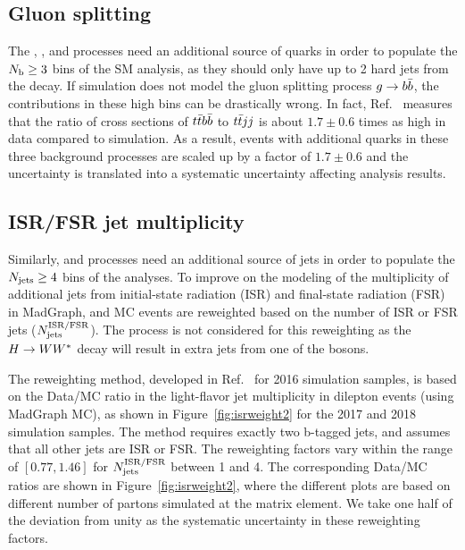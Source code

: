 \subsection{Gluon splitting}

The \ttW, \ttZ, and \ttH processes need an additional source of \cPqb quarks
in order to populate the $N_\mathrm{b}\geq 3$ bins of the SM \tttt analysis, as
they should only have up to 2 hard \cPqb jets from the \ttbar decay.
If simulation does not model the gluon splitting process $g\rightarrow b\bar{b}$,
the contributions in these high \Nbjets bins can be drastically wrong.
In fact, Ref.~\cite{CMS:ttbb} measures that the ratio of cross sections
of $t\bar{t}b\bar{b}$ to $t\bar{t} jj$ is about $1.7\pm0.6$ times as high in data
compared to simulation. As a result, events with additional \cPqb quarks
in these three background processes are scaled up by a factor of 
$1.7\pm0.6$ and the uncertainty is translated into
a systematic uncertainty affecting analysis results. 

\subsection{ISR/FSR jet multiplicity}

Similarly, \ttW and \ttZ processes need an additional source of jets
in order to populate the $N_\text{jets} \geq 4$ bins of the analyses.
To improve on the modeling of the
multiplicity of additional jets from initial-state radiation (ISR) and
final-state radiation (FSR) in MadGraph,
\ttW and \ttZ MC events are reweighted based on the
number of ISR or FSR jets ($N_\text{jets}^{\rm ISR/FSR}$).
The \ttH process is not considered for this reweighting as
the $H\rightarrow WW^*$ decay will result in extra jets from one
of the \PW bosons.

The reweighting method, developed in Ref.~\cite{CMS:isrweight} for 2016
simulation samples, is based on the Data/MC ratio in the light-flavor jet
multiplicity in dilepton \ttbar events (using MadGraph MC), as shown in
Figure~\ref{fig:isrweight2} for the 2017 and 2018 simulation samples. The
method requires exactly two b-tagged jets, and assumes that all other jets
are ISR or FSR. The reweighting factors vary within the range of
$[0.77,1.46]$ for $N_\text{jets}^{\rm ISR/FSR}$ between 1 and 4. The corresponding
Data/MC ratios are shown in Figure~\ref{fig:isrweight2}, where the different
plots are based on different number of partons simulated at the matrix
element. We take one half of the deviation from unity as the systematic
uncertainty in these reweighting factors.

